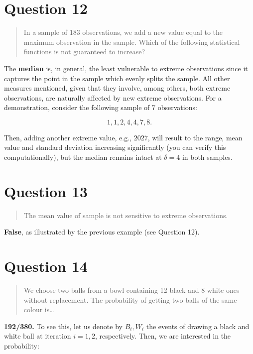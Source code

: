 \documentclass[
]{article}
\begin{document}
\section{Question 12}\label{question-12}

\begin{quote}
In a sample of 183 observations, we add a new value equal to the maximum
observation in the sample. Which of the following statistical functions
is not guaranteed to increase?
\end{quote}

The \textbf{median} is, in general, the least vulnerable to extreme
observations since it captures the point in the sample which evenly
splits the sample. All other measures mentioned, given that they
involve, among others, both extreme observations, are naturally affected
by new extreme observations. For a demonstration, consider the following
sample of 7 observations:

\[1,1,2,4,4,7,8.\]

Then, adding another extreme value, e.g., \(2027\), will result to the
range, mean value and standard deviation increasing significantly (you
can verify this computationally), but the median remains intact at
\(\delta=4\) in both samples.

\section{Question 13}\label{question-13}

\begin{quote}
The mean value of sample is not sensitive to extreme observations.
\end{quote}

\textbf{False}, as illustrated by the previous example (see Question
12).

\section{Question 14}\label{question-14}

\begin{quote}
We choose two balls from a bowl containing 12 black and 8 white ones
without replacement. The probability of getting two balls of the same
colour is\ldots{}
\end{quote}

\textbf{192/380.} To see this, let us denote by \(B_i,W_i\) the events
of drawing a black and white ball at iteration \(i=1,2\), respectively.
Then, we are interested in the probability:
\end{document}
